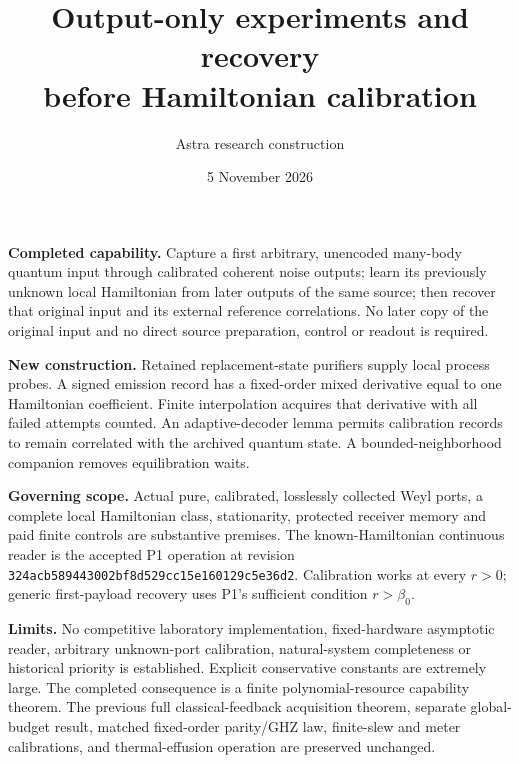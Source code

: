 \documentclass[11pt]{article}
\title{\textbf{Output-only experiments and recovery\\before Hamiltonian calibration}}
\author{Astra research construction}\date{5 November 2026}
\begin{document}
\setlength{\emergencystretch}{3em}
\hypersetup{pageanchor=false}
\begin{titlepage}\maketitle\thispagestyle{empty}\vspace{8mm}
\noindent\textbf{Completed capability.}
Capture a first arbitrary, unencoded many-body quantum input through calibrated coherent noise outputs; learn its previously unknown local Hamiltonian from later outputs of the same source; then recover that original input and its external reference correlations. No later copy of the original input and no direct source preparation, control or readout is required.

\vspace{5mm}\noindent\textbf{New construction.}
Retained replacement-state purifiers supply local process probes. A signed emission record has a fixed-order mixed derivative equal to one Hamiltonian coefficient. Finite interpolation acquires that derivative with all failed attempts counted. An adaptive-decoder lemma permits calibration records to remain correlated with the archived quantum state. A bounded-neighborhood companion removes equilibration waits.

\vspace{5mm}\noindent\textbf{Governing scope.}
Actual pure, calibrated, losslessly collected Weyl ports, a complete local Hamiltonian class, stationarity, protected receiver memory and paid finite controls are substantive premises. The known-Hamiltonian continuous reader is the accepted P1 operation at revision \texttt{324acb589443002bf8d529cc15e160129c5e36d2}. Calibration works at every \(r>0\); generic first-payload recovery uses P1's sufficient condition \(r>\beta_0\).

\vspace{5mm}\noindent\textbf{Limits.}
No competitive laboratory implementation, fixed-hardware asymptotic reader, arbitrary unknown-port calibration, natural-system completeness or historical priority is established. Explicit conservative constants are extremely large. The completed consequence is a finite polynomial-resource capability theorem.
\vfill
\noindent The previous full classical-feedback acquisition theorem, separate global-budget result, matched fixed-order parity/GHZ law, finite-slew and meter calibrations, and thermal-effusion operation are preserved unchanged.
\end{titlepage}\hypersetup{pageanchor=true}
\tableofcontents\newpage
\end{document}

